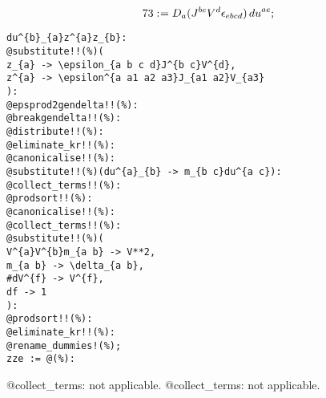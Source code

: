 \documentclass[11pt]{article}
\def\specialcolon{\mathrel{\mathop{:}}\hspace{-.5em}}
\begin{document}
\begin{dmath*}[compact, spread=2pt]
73\specialcolon{}= {D}_{a}{({J}^{b c} {V}^{d} {\epsilon}_{e b c d})}\,  {du}^{a e};
\end{dmath*}
{\color[named]{Blue}\begin{verbatim}
du^{b}_{a}z^{a}z_{b}:
@substitute!!(%)(
z_{a} -> \epsilon_{a b c d}J^{b c}V^{d},
z^{a} -> \epsilon^{a a1 a2 a3}J_{a1 a2}V_{a3}
):
@epsprod2gendelta!!(%):
@breakgendelta!!(%):
@distribute!!(%):
@eliminate_kr!!(%):
@canonicalise!!(%):
@substitute!!(%)(du^{a}_{b} -> m_{b c}du^{a c}):
@collect_terms!!(%):
@prodsort!!(%):
@canonicalise!!(%):
@collect_terms!!(%):
@substitute!!(%)(
V^{a}V^{b}m_{a b} -> V**2,
m_{a b} -> \delta_{a b},
#dV^{f} -> V^{f},
df -> 1
):
@prodsort!!(%):
@eliminate_kr!!(%):
@rename_dummies!(%);
zze := @(%):
\end{verbatim}}
@collect\_terms: not applicable.
@collect\_terms: not applicable.
\end{document}
